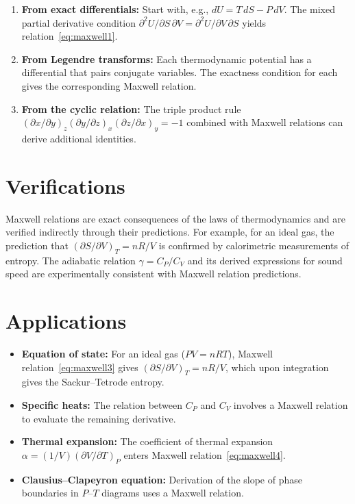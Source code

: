 \begin{enumerate}
  \item \textbf{From exact differentials:} Start with, e.g., $dU = T\,dS - P\,dV$. The mixed partial derivative condition $\partial^{2}U/\partial S\,\partial V = \partial^{2}U/\partial V\,\partial S$ yields relation~\eqref{eq:maxwell1}.
  \item \textbf{From Legendre transforms:} Each thermodynamic potential has a differential that pairs conjugate variables. The exactness condition for each gives the corresponding Maxwell relation.
  \item \textbf{From the cyclic relation:} The triple product rule $(\partial x/\partial y)_{z}(\partial y/\partial z)_{x}(\partial z/\partial x)_{y} = -1$ combined with Maxwell relations can derive additional identities.
\end{enumerate}
\section*{Verifications}

Maxwell relations are exact consequences of the laws of thermodynamics and are verified indirectly through their predictions. For example, for an ideal gas, the prediction that $(\partial S/\partial V)_{T} = nR/V$ is confirmed by calorimetric measurements of entropy. The adiabatic relation $\gamma = C_{P}/C_{V}$ and its derived expressions for sound speed are experimentally consistent with Maxwell relation predictions.
\section*{Applications}

\begin{itemize}
  \item \textbf{Equation of state:} For an ideal gas ($PV = nRT$), Maxwell relation~\eqref{eq:maxwell3} gives $(\partial S/\partial V)_{T} = nR/V$, which upon integration gives the Sackur--Tetrode entropy.
  \item \textbf{Specific heats:} The relation between $C_{P}$ and $C_{V}$ involves a Maxwell relation to evaluate the remaining derivative.
  \item \textbf{Thermal expansion:} The coefficient of thermal expansion $\alpha = (1/V)(\partial V/\partial T)_{P}$ enters Maxwell relation~\eqref{eq:maxwell4}.
  \item \textbf{Clausius--Clapeyron equation:} Derivation of the slope of phase boundaries in $P$--$T$ diagrams uses a Maxwell relation.
\end{itemize}
